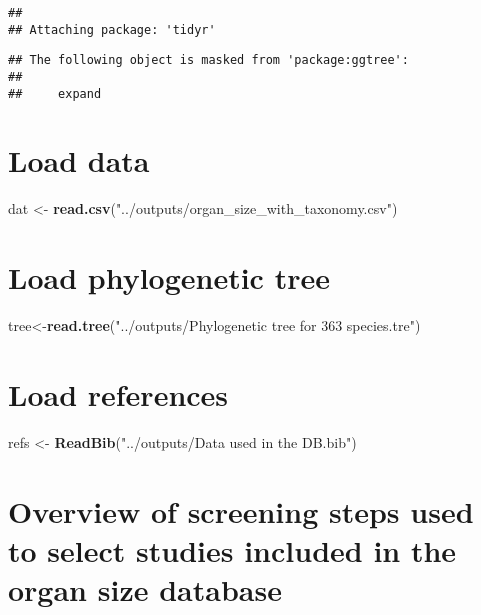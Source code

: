 \documentclass[
]{article}
\newenvironment{Shaded}{\begin{snugshade}}{\end{snugshade}}
\newcommand{\FunctionTok}[1]{\textcolor[rgb]{0.13,0.29,0.53}{\textbf{#1}}}
\newcommand{\NormalTok}[1]{#1}
\newcommand{\OtherTok}[1]{\textcolor[rgb]{0.56,0.35,0.01}{#1}}
\newcommand{\StringTok}[1]{\textcolor[rgb]{0.31,0.60,0.02}{#1}}
\begin{document}
\begin{verbatim}
## 
## Attaching package: 'tidyr'
\end{verbatim}

\begin{verbatim}
## The following object is masked from 'package:ggtree':
## 
##     expand
\end{verbatim}

\section{Load data}\label{load-data}

\begin{Shaded}
\begin{Highlighting}[]
\NormalTok{dat }\OtherTok{\textless{}{-}} \FunctionTok{read.csv}\NormalTok{(}\StringTok{"../outputs/organ\_size\_with\_taxonomy.csv"}\NormalTok{)}
\end{Highlighting}
\end{Shaded}

\section{Load phylogenetic tree}\label{load-phylogenetic-tree}

\begin{Shaded}
\begin{Highlighting}[]
\NormalTok{tree}\OtherTok{\textless{}{-}}\FunctionTok{read.tree}\NormalTok{(}\StringTok{"../outputs/Phylogenetic tree for 363 species.tre"}\NormalTok{)}
\end{Highlighting}
\end{Shaded}

\section{Load references}\label{load-references}

\begin{Shaded}
\begin{Highlighting}[]
\NormalTok{refs }\OtherTok{\textless{}{-}} \FunctionTok{ReadBib}\NormalTok{(}\StringTok{"../outputs/Data used in the DB.bib"}\NormalTok{)}
\end{Highlighting}
\end{Shaded}

\section{Overview of screening steps used to select studies included in the organ size database}\label{overview-of-screening-steps-used-to-select-studies-included-in-the-organ-size-database}
\end{document}
